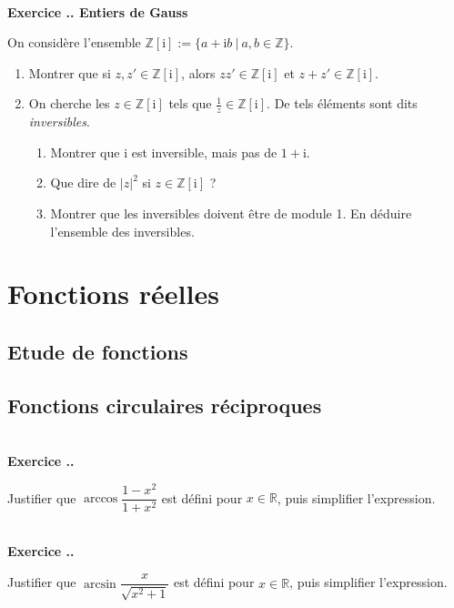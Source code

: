 \documentclass{article}
\newcommand{\mb}[1]{\mathbb{#1}}
\newcounter{exo}
\newcommand{\exercice}[1][\null]{\textbf{\\ Exercice \thesection.\theexo. #1} \addtocounter{exo}{1}}
\begin{document}
\exercice[Entiers de Gauss]

On considère l'ensemble $\mb{Z}[\text{i}] := \{a + \text{i}b~|~a, b \in \mb{Z}\}$.

\begin{enumerate}

\item Montrer que si $z, z' \in \mb{Z}[\text{i}]$, alors $zz' \in \mb{Z}[\text{i}]$ et $z+z' \in \mb{Z}[\text{i}]$.

\item On cherche les $z \in \mb{Z}[\text{i}] $ tels que $ \frac{1}{z} \in \mb{Z}[\text{i}]$. De tels éléments sont dits \emph{inversibles}.

\begin{enumerate}

\item Montrer que $\text{i}$ est inversible, mais pas de $1+ \text{i}$.

\item Que dire de $|z|^2$ si $z \in \mb{Z}[\text{i}]$ ?

\item Montrer que les inversibles doivent être de module 1. En déduire l'ensemble des inversibles.


\end{enumerate}


\end{enumerate}





\section{Fonctions réelles}

\subsection{Etude de fonctions}
        
\subsection{Fonctions circulaires réciproques}

\exercice

Justifier que $\arccos \dfrac{1-x^2}{1+x^2}$ est défini pour $x \in \mb{R}$, puis simplifier l'expression.

\exercice

Justifier que $\arcsin \dfrac{x}{\sqrt{x^2 +1}}$ est défini pour $x \in \mb{R}$, puis simplifier l'expression.
\end{document}
